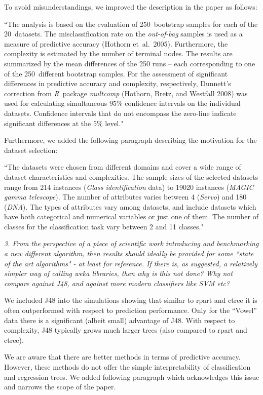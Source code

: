 \documentclass[DIN, pagenumber=false, parskip=half,%
               fromalign=left, fromphone=true,%
               fromemail=true, fromurl=false, %
               fromlogo=true, fromrule=false, fromrule=afteraddress]{scrlttr2}
\begin{document}
To avoid misunderstandings, we improved the description in the paper as follows:

``The analysis is based on the evaluation of 250~bootstrap
samples for each of the 20~datasets. The misclassification rate on the
\textit{out-of-bag} samples is used as a measure of
predictive accuracy (Hothorn et~al.~2005). Furthermore, the complexity is estimated by the number of
terminal nodes. The results are summarized by the mean differences of the 250 runs -- each corresponding to
one of the 250~different bootstrap samples. For the assessment of significant differences 
in predictive accuracy and complexity, respectively, 
Dunnett's correction from \textit{R}~package \textit{multcomp} (Hothorn, Bretz, and Westfall 2008) was used
for calculating simultaneous $95\%$ confidence intervals on the individual datasets. Confidence intervals
that do not encompass the zero-line indicate significant differences at the $5\%$ level."

Furthermore, we added the following paragraph describing the motivation for the dataset selection:

``The datasets were chosen from different domains and cover a wide range of
dataset characteristics and complexities. The sample sizes of the selected
datasets range from 214 instances (\textit{Glass identification} data) to 19020
instances (\emph{MAGIC gamma telescope}). The number of attributes varies between
4 (\textit{Servo}) and 180 (\emph{DNA}). The types of attributes vary among
datasets, and include datasets which have both categorical and numerical
variables or just one of them. The number of classes for the classification task
vary between 2 and 11 classes."


\textit{3. From the perspective of  a piece of scientific work introducing 
and benchmarking a new  different algorithm, then results should 
ideally be provided for some ``state of the art algorithms" - at 
least for reference.  If there is, as suggested, a relatively 
simpler way of calling weka libraries,  then why is this not 
done?  Why not compare against J48,  and against more modern 
classifiers like SVM etc?}

We included J48 into the simulations showing that similar to rpart and ctree it
is often outperformed with respect to prediction performance. Only for the ``Vowel''
data there is a significant (albeit small) advantage of J48. With respect to complexity,
J48 typically grows much larger trees (also compared to rpart and ctree).

We are aware that there are better methods in terms of predictive accuracy.
However, these methods do not offer the simple
interpretability of classification and regression trees. We added following
paragraph which acknowledges this issue and narrows the scope of the paper.
\end{document}
